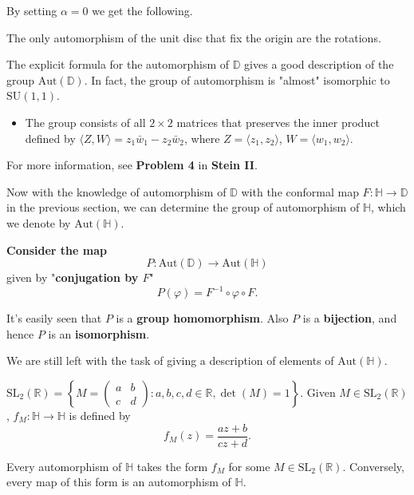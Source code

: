 \documentclass{article}
\begin{document}
By setting $\alpha = 0$ we get the following.

\begin{corollary}
The only automorphism of the unit disc that fix the origin are the rotations.
\end{corollary}
\begin{remark}
The explicit formula for the automorphism of $\mathbb{D}$ gives a good description of the group $\text{Aut}(\mathbb{D})$. In fact, the group of automorphism is "almost" isomorphic to $\text{SU}(1,1)$.
\begin{itemize}
    \item The group consists of all $2 \times 2$ matrices that preserves the inner product defined by $\langle Z, W \rangle = z_1 \bar{w}_1 - z_2 \bar{w}_2$, where $Z = \langle z_1, z_2 \rangle$, $W = \langle w_1, w_2 \rangle$.
\end{itemize}

For more information, see \textbf{Problem 4} in \textbf{Stein II}.
\end{remark}

Now with the knowledge of automorphism of $\mathbb{D}$ with the conformal map $F: \mathbb{H} \to \mathbb{D}$ in the previous section, we can determine the group of automorphism of $\mathbb{H}$, which we denote by $\text{Aut}(\mathbb{H})$.

\textbf{Consider the map}
$$P: \text{Aut}(\mathbb{D}) \to \text{Aut}(\mathbb{H})$$
given by "\textbf{conjugation by $F$}"
$$P(\varphi) = F^{-1} \circ \varphi \circ F.$$

It's easily seen that $P$ is a \textbf{group homomorphism}.
Also $P$ is a \textbf{bijection}, and hence $P$ is an \textbf{isomorphism}.

We are still left with the task of giving a description of elements of $\text{Aut}(\mathbb{H})$.

\begin{definition}
$\text{SL}_2(\mathbb{R}) = \left\{ M = \begin{pmatrix} a & b \\ c & d \end{pmatrix} : a, b, c, d \in \mathbb{R}, \det(M) = 1 \right\}$.
Given $M \in \text{SL}_2(\mathbb{R})$, $f_M: \mathbb{H} \to \mathbb{H}$ is defined by
$$f_M(z) = \frac{az + b}{cz + d}.$$
\end{definition}

\begin{theorem}
Every automorphism of $\mathbb{H}$ takes the form $f_M$ for some $M \in \text{SL}_2(\mathbb{R})$. Conversely, every map of this form is an automorphism of $\mathbb{H}$.
\end{theorem}
\end{document}
